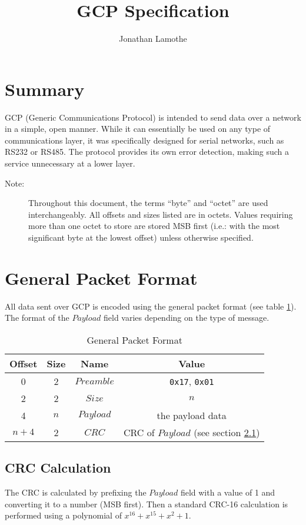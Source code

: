 \documentclass{article}
\title{GCP Specification}
\author{Jonathan Lamothe}
\begin{document}
\maketitle

\section{Summary}
GCP (Generic Communications Protocol) is intended to send data over a
network in a simple, open manner.  While it can essentially be used on
any type of communications layer, it was specifically designed for
serial networks, such as RS232 or RS485.  The protocol provides its
own error detection, making such a service unnecessary at a lower
layer.

\begin{description}
  \item[Note:]Throughout this document, the terms ``byte'' and
    ``octet'' are used interchangeably.  All offsets and sizes listed
    are in octets.  Values requiring more than one octet to store are
    stored MSB first (i.e.: with the most significant byte at the
    lowest offset) unless otherwise specified.
\end{description}

\section{General Packet Format}
All data sent over GCP is encoded using the general packet format (see
table \ref{tab:gen-pkt-fmt}).  The format of the $Payload$ field
varies depending on the type of message.

\begin{table}[hbp]
  \center
  \begin{tabular}{cccc}
    \textbf{Offset} & \textbf{Size} & \textbf{Name} & \textbf{Value}\\
    \hline
    0 & 2 & $Preamble$ & \texttt{0x17}, \texttt{0x01}\\
    2 & 2 & $Size$ & $n$\\
    4 & $n$ & $Payload$ & the payload data\\
    $n + 4$ & 2 & $CRC$ & CRC of $Payload$ (see section \ref{sec:crc})\\
    \hline
  \end{tabular}
  \caption{General Packet Format\label{tab:gen-pkt-fmt}}
\end{table}

\subsection{CRC Calculation}
\label{sec:crc}
The CRC is calculated by prefixing the $Payload$ field with a value of
1 and converting it to a number (MSB first).  Then a standard CRC-16
calculation is performed using a polynomial of $x^{16} + x^{15} + x^2
+ 1$.
\end{document}
